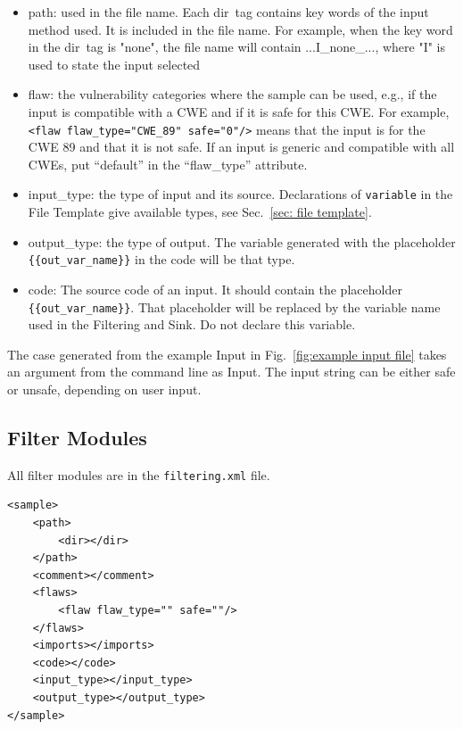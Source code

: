 \documentclass[12pt]{article}
\begin{document}
\begin{itemize}
    \item path: used in the file name. Each \texlangle dir\texrangle\ tag contains key words of the input method used. It is included in the file name. For example, when the key word in the \texlangle dir\texrangle\ tag is "none", the file name will contain ...I\_none\_..., where "I" is used to state the input selected
    
    \item flaw: the vulnerability categories where the sample can be used, e.g., if the input is compatible with a CWE and if it is safe for this CWE. For example, \\
    \verb|<flaw flaw_type="CWE_89" safe="0"/>| means that the input is for the CWE 89 and that it is not safe.  If an input is generic and compatible with all CWEs, put ``default'' in the ``flaw\_type'' attribute.

    \item input\_type: the type of input and its source.
    Declarations of \verb|variable| in the File Template give
    available types, see Sec.~\ref{sec: file template}.

    \item output\_type: the type of output.  The variable generated with the placeholder \\ \verb|{{out_var_name}}| in the code will be that type.

    \item code: The source code of an input. It should contain the placeholder \\ \verb|{{out_var_name}}|.  That placeholder will be replaced by the variable name used in the Filtering and Sink.  Do not declare this variable.
\end{itemize}

The case generated from the example Input in 
Fig.~\ref{fig:example input file}
takes an argument from the command line as Input.  
The input string can be either safe or unsafe, depending on user input.

\subsection{Filter Modules}

All filter modules are in the \verb|filtering.xml| file.

\begin{verbatim}
<sample>
    <path>
	    <dir></dir>
    </path>
    <comment></comment>
    <flaws>
	    <flaw flaw_type="" safe=""/>
    </flaws>
    <imports></imports>
    <code></code>
    <input_type></input_type>
    <output_type></output_type>
</sample>
\end{verbatim}
\end{document}
